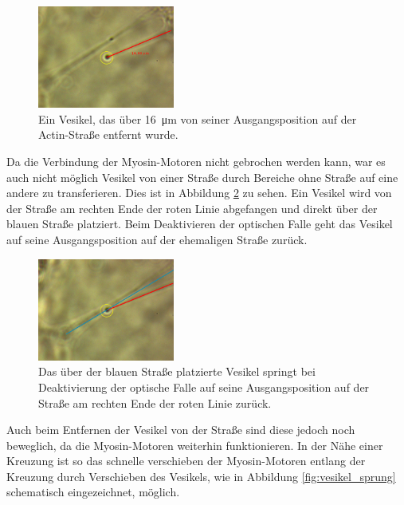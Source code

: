         \FloatBarrier
        \begin{figure}[h]
        \centering
        \includegraphics[width = 0.4\textwidth]{pictures/vesikel_abstand.png}
        \caption{Ein Vesikel, das über \SI{16}{\micro\metre} von seiner Ausgangsposition auf der Actin-Straße entfernt wurde.}
        \label{fig:vesikel_abstand}
        \end{figure}
        \FloatBarrier 
        Da die Verbindung der Myosin-Motoren nicht gebrochen werden kann, war es auch nicht möglich Vesikel von einer Straße durch Bereiche ohne Straße auf eine andere zu transferieren. Dies ist in Abbildung
        \ref{fig:vesikel_overlap} zu sehen. Ein Vesikel wird von der Straße am rechten Ende der roten Linie abgefangen und direkt über der blauen Straße platziert. Beim Deaktivieren der optischen Falle geht das 
        Vesikel auf seine Ausgangsposition auf der ehemaligen Straße zurück. 
        \FloatBarrier
        \begin{figure}[h]
        \centering
        \includegraphics[width = 0.4\textwidth]{pictures/vesikel_overlap.png}
        \caption{Das über der blauen Straße platzierte Vesikel springt bei Deaktivierung der optische Falle auf seine Ausgangsposition auf der Straße am rechten Ende der roten Linie zurück.}
        \label{fig:vesikel_overlap}
        \end{figure}
        \FloatBarrier 
        \newpage
        Auch beim Entfernen der Vesikel von der Straße sind diese jedoch noch beweglich, da die Myosin-Motoren weiterhin funktionieren. In der Nähe einer Kreuzung ist so das schnelle verschieben der 
        Myosin-Motoren entlang der Kreuzung durch Verschieben des Vesikels, wie in Abbildung \ref{fig:vesikel_sprung} schematisch eingezeichnet, möglich.
